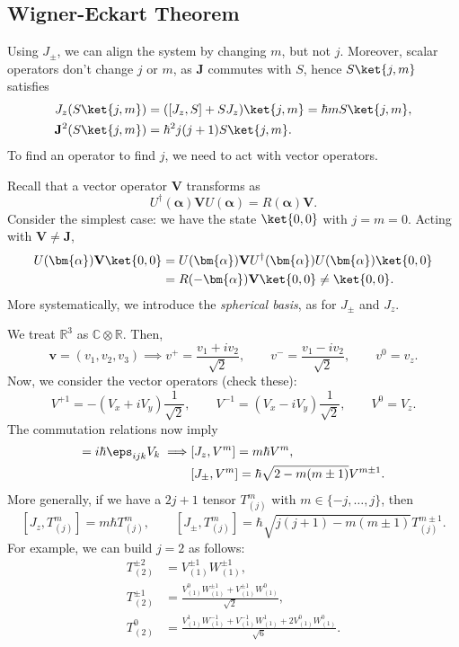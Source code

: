 \documentclass[12pt]{article}
\begin{document}
\subsection{Wigner-Eckart Theorem}
\label{sub:we_thm}

Using $J_{\pm}$, we can align the system by changing $m$, but not $j$. Moreover, scalar operators don't change $j$ or $m$, as $\mathbf{J}$ commutes with $S$, hence $S \ket{j,m}$ satisfies
\begin{align*}
	J_z(S\ket{j,m}) &= ([J_z, S] + S J_z)\ket{j,m} = \hbar m S \ket{j,m}, \\
	\mathbf{J}^2 (S \ket{j,m}) &= \hbar^2 j(j+1) S\ket{j,m}.
\end{align*}
To find an operator to find $j$, we need to act with vector operators.

Recall that a vector operator $\mathbf{V}$ transforms as
\[
U^{\dagger}(\bm{\alpha}) \mathbf{V} U(\bm{\alpha}) = R(\bm{\alpha}) \mathbf{V}.
\]
Consider the simplest case: we have the state $\ket{0,0}$ with $j = m = 0$. Acting with $\mathbf{V} \neq \mathbf{J}$,
\begin{align*}
	U(\bm{\alpha}) \mathbf{V} \ket {0,0} &= U(\bm{\alpha}) \mathbf{V} U^{\dagger}(\bm{\alpha}) U(\bm{\alpha}) \ket{0,0} \\
					     &= R(-\bm{\alpha}) \mathbf{V} \ket{0,0} \neq \ket{0,0}.
\end{align*}
More systematically, we introduce the \emph{spherical basis}, as for $J_{\pm}$ and $J_z$.

We treat $\mathbb{R}^3$ as $\mathbb{C} \otimes \mathbb{R}$. Then,
\[
\mathbf{v} = (v_1, v_2, v_3) \implies v^+ = \frac{v_1 + i v_2}{\sqrt 2}, \qquad v^- = \frac{v_1 - i v_2}{\sqrt 2}, \qquad v^0 = v_z.
\]
Now, we consider the vector operators (check these):
\[
V^{+ 1}  = - (V_x + i V_y) \frac{1}{\sqrt 2}, \qquad V^{-1} = (V_x - i V_y) \frac{1}{\sqrt 2}, \qquad V^0 = V_z.
\]
The commutation relations now imply
\begin{align*}
	[J_i, V_j] = i \hbar \eps_{ijk} V_k \implies & [J_z, V^m] = m \hbar V^m, \\
		   &[J_{\pm}, V^m] = \hbar \sqrt{2 - m(m\pm 1)} V^{m \pm 1}.
\end{align*}
More generally, if we have a $2j+1$ tensor $T_{(j)}^{m}$ with $m \in \{-j, \ldots, j\}$, then
\[
	[J_z, T_{(j)}^{m}] = m \hbar T_{(j)}^{m}, \qquad [J_{\pm}, T_{(j)}^m] = \hbar \sqrt{j(j+1)-m(m\pm 1)} T_{(j)}^{m \pm 1}.
\]
For example, we can build $j = 2$ as follows:
\begin{align*}
	T_{(2)}^{\pm 2} &= V_{(1)}^{\pm1} W_{(1)}^{\pm1}, \\
	T_{(2)}^{\pm 1} &= \frac{V_{(1)}^{0}W_{(1)}^{\pm1} + V_{(1)}^{\pm1}W_{(1)}^0}{\sqrt 2},\\
	T_{(2)}^0 &= \frac{V_{(1)}^1W_{(1)}^{-1} + V_{(1)}^{-1} W_{(1)}^{1} + 2 V_{(1)}^0 W_{(1)}^0}{\sqrt 6}.
\end{align*}
\end{document}
